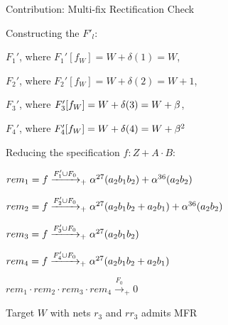 \begin{frame}{\large Contribution: Multi-fix Rectification Check}
\bi
	\item Constructing the $F'_l$:
	\bi
		\item {$F_1'$, where $F_1'[f_W]=W+\delta(1)=W$},
		\item {$F_2'$, where $F_2'[f_W]=W+\delta(2)=W+1$},
		\item {$F_3'$, where $F_3'[f_W]=W+\delta(3)=W+\beta$},
		\item {$F_4'$, where $F_4'[f_W]=W+\delta(4)=W+\beta^2$}
	\ei
	\vspace{0.1in}
	\pause
	\item Reducing the specification $f: Z+A\cdot B$:
\bi
\item $rem_1 = f \xrightarrow[]{F_1'\cup F_{0}}_+{\alpha^{27} (a_2b_1b_2)+\alpha^{36} (a_2b_2)}$
\item $rem_2 = f \xrightarrow[]{F_2'\cup F_{0}}_+{\alpha^{27} (a_2b_1b_2+a_2b_1)+\alpha^{36} (a_2b_2)}$
\item $rem_3 = f \xrightarrow[]{F_3'\cup F_{0}}_+{\alpha^{27} (a_2b_1b_2)}$
\item $rem_4 = f \xrightarrow[]{F_4'\cup F_{0}}_+{\alpha^{27} (a_2b_1b_2+a_2b_1)}$
\ei \pause
	\item $rem_1\cdot rem_2 \cdot rem_3 \cdot rem_4 \xrightarrow{F_0}_+0$
	\item Target $W$ with nets $r_3$ and $rr_3$ admits MFR
\ei
\end{frame}


